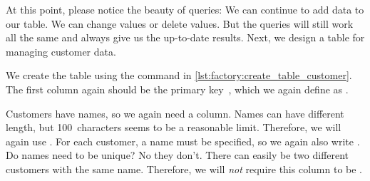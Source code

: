 At this point, please notice the beauty of queries:
We can continue to add data to our table.
We can change values or delete values.
But the queries will still work all the same and always give us the up-to-date results.%
\endhsection%
\FloatBarrier%
\endhsection%
%
Next, we design a table for managing customer data.%
%
%
%
%
\begin{sloppypar}%
We create the table  using the  command in \cref{lst:factory:create_table_customer}.
The first column again should be the primary key~, which we again define as .
\end{sloppypar}%
%
Customers have names, so we again need a  column.
Names can have different length, but 100~characters seems to be a reasonable limit.
Therefore, we will again use .
For each customer, a name must be specified, so we again also write .
Do names need to be unique?
No they don't.
There can easily be two different customers with the same name.
Therefore, we will \emph{not} require this column to be .

